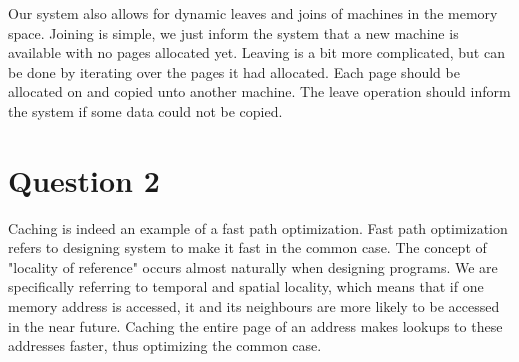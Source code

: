 \documentclass[11pt]{article}
\begin{document}
Our system also allows for dynamic leaves and joins of machines in the memory
space. Joining is simple, we just inform the system that a new machine is
available with no pages allocated yet. Leaving is a bit more complicated, but
can be done by iterating over the pages it had allocated. Each page should be
allocated on and copied unto another machine. The leave operation should inform
the system if some data could not be copied.

\section{Question 2}




Caching is indeed an example of a fast path optimization. Fast path optimization
refers to designing system to make it fast in the common case. The concept of
"locality of reference" occurs almost naturally when designing programs.
We are specifically referring to temporal and spatial locality, which means that
if one memory address is accessed, it and its neighbours are more likely to be
accessed in the near future. Caching the entire page of an address makes lookups
to these addresses faster, thus optimizing the common case.
\end{document}
